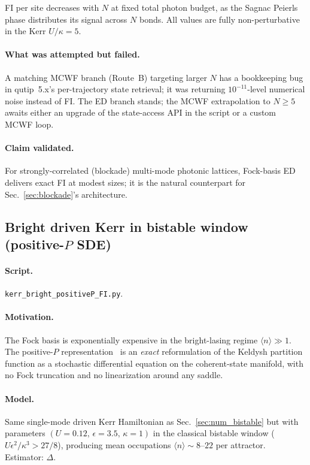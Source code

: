 \documentclass[11pt]{article}
\begin{document}
FI per site decreases with $N$ at fixed total photon budget, as the
Sagnac Peierls phase distributes its signal across $N$ bonds.  All
values are fully non-perturbative in the Kerr $U/\kappa=5$.

\paragraph{What was attempted but failed.}  A matching MCWF branch
(Route~B) targeting larger $N$ has a bookkeeping bug in qutip~5.x's
per-trajectory state retrieval; it was returning $10^{-11}$-level
numerical noise instead of FI.  The ED branch stands; the MCWF
extrapolation to $N\geq 5$ awaits either an upgrade of the state-access
API in the script or a custom MCWF loop.

\paragraph{Claim validated.}  For strongly-correlated (blockade) multi-mode
photonic lattices, Fock-basis ED delivers exact FI at modest sizes; it
is the natural counterpart for Sec.~\ref{sec:blockade}'s
architecture.

\subsection{Bright driven Kerr in bistable window (positive-$P$ SDE)}
\label{sec:num_positiveP}

\paragraph{Script.} \texttt{kerr\_bright\_positiveP\_FI.py}.

\paragraph{Motivation.}  The Fock basis is exponentially expensive in
the bright-lasing regime $\langle n\rangle\gg 1$.  The positive-$P$
representation~\cite{DrummondGardiner1980} is an \emph{exact}
reformulation of the Keldysh partition function as a stochastic
differential equation on the coherent-state manifold, with no Fock
truncation and no linearization around any saddle.

\paragraph{Model.}  Same single-mode driven Kerr Hamiltonian as
Sec.~\ref{sec:num_bistable} but with parameters
$(U=0.12,\,\epsilon=3.5,\,\kappa=1)$ in the classical bistable window
($U\epsilon^2/\kappa^3 > 27/8$), producing mean occupations
$\langle n\rangle\sim 8$--$22$ per attractor.  Estimator: $\Delta$.
\end{document}
